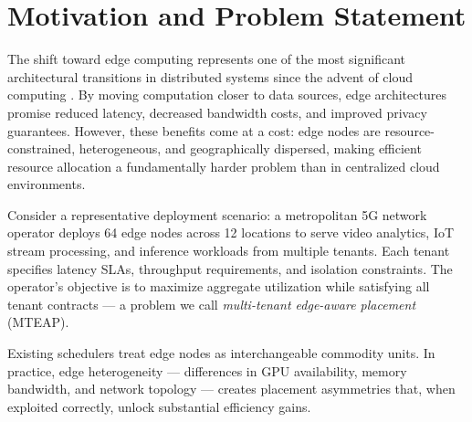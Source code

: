 \section{Motivation and Problem Statement}

The shift toward edge computing represents one of the most significant architectural transitions in distributed systems since the advent of cloud computing \cite{talwar2019}. By moving computation closer to data sources, edge architectures promise reduced latency, decreased bandwidth costs, and improved privacy guarantees. However, these benefits come at a cost: edge nodes are resource-constrained, heterogeneous, and geographically dispersed, making efficient resource allocation a fundamentally harder problem than in centralized cloud environments.

Consider a representative deployment scenario: a metropolitan 5G network operator deploys 64 edge nodes across 12 locations to serve video analytics, IoT stream processing, and inference workloads from multiple tenants. Each tenant specifies latency SLAs, throughput requirements, and isolation constraints. The operator's objective is to maximize aggregate utilization while satisfying all tenant contracts --- a problem we call \textit{multi-tenant edge-aware placement} (MTEAP).

\begin{tcolorbox}[colback=uwaterlooGold!10,colframe=uwaterlooGold!60,title=\textbf{Key Insight}]
Existing schedulers treat edge nodes as interchangeable commodity units. In practice, edge heterogeneity --- differences in GPU availability, memory bandwidth, and network topology --- creates placement asymmetries that, when exploited correctly, unlock substantial efficiency gains.
\end{tcolorbox}
